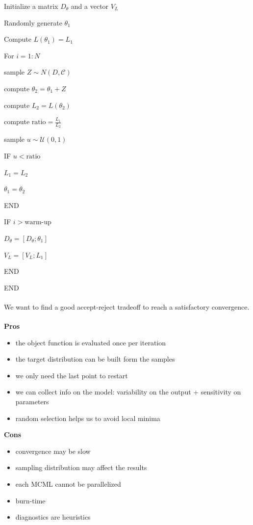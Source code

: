 Initialize a matrix $D_\theta$ and a vector $V_L$

Randomly generate $\theta_1$

Compute $L(\theta_1)=L_1$

For $i=1:N$

	sample $Z \sim N(D,\mathcal{C})$

	compute $\theta_2=\theta_1+Z$

	compute $L_2=L(\theta_2)$

	compute $\text{ratio}=\frac{L_1}{L_2}$

	sample $u \sim\mathcal{U}(0,1)$

	IF $u < \text{ratio}$

		$L_1=L_2$

		$\theta_1=\theta_2$

	END

	IF $i > \text{warm-up}$

		$D_\theta=[D_\theta;\theta_1]$

		$V_L=[V_L;L_1]$

	END

END
\\
\\
\noindent
We want to find a good accept-reject tradeoff to reach a satisfactory
convergence.
\\
\\
\noindent
\textbf{Pros}

\begin{itemize}
\tightlist
\item
  the object function is evaluated once per iteration
\item
  the target distribution can be built form the samples
\item
  we only need the last point to restart
\item
  we can collect info on the model: variability on the output +
  sensitivity on parameters
\item
  random selection helps us to avoid local minima
\end{itemize}

\noindent
\textbf{Cons}

\begin{itemize}
\tightlist
\item
  convergence may be slow
\item
  sampling distribution may affect the results
\item
  each MCML cannot be parallelized
\item
  burn-time
\item
  diagnostics are heuristics
\end{itemize}


